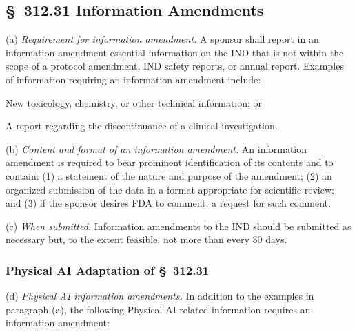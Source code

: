 
\subsection{\S~312.31 Information Amendments}

(a) \textit{Requirement for information amendment.} A sponsor shall report in an information amendment essential information on the IND that is not within the scope of a protocol amendment, IND safety reports, or annual report. Examples of information requiring an information amendment include:

\begin{description}[leftmargin=0.5cm,style=sameline]
\item[(1)] New toxicology, chemistry, or other technical information; or
\item[(2)] A report regarding the discontinuance of a clinical investigation.
\end{description}

(b) \textit{Content and format of an information amendment.} An information amendment is required to bear prominent identification of its contents and to contain: (1) a statement of the nature and purpose of the amendment; (2) an organized submission of the data in a format appropriate for scientific review; and (3) if the sponsor desires FDA to comment, a request for such comment.

(c) \textit{When submitted.} Information amendments to the IND should be submitted as necessary but, to the extent feasible, not more than every 30 days.

\subsubsection{Physical AI Adaptation of \S~312.31}

(d) \textit{Physical AI information amendments.} In addition to the examples in paragraph (a), the following Physical AI-related information requires an information amendment:

